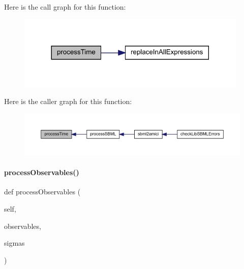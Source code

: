 Here is the call graph for this function\+:
\nopagebreak
\begin{figure}[H]
\begin{center}
\leavevmode
\includegraphics[width=312pt]{classamici_1_1sbml__import_1_1_sbml_importer_a2819c6ad1b541e49e728aa172e57208e_cgraph}
\end{center}
\end{figure}
Here is the caller graph for this function\+:
\nopagebreak
\begin{figure}[H]
\begin{center}
\leavevmode
\includegraphics[width=350pt]{classamici_1_1sbml__import_1_1_sbml_importer_a2819c6ad1b541e49e728aa172e57208e_icgraph}
\end{center}
\end{figure}
\mbox{\label{classamici_1_1sbml__import_1_1_sbml_importer_a903b87aa6c483832424fa2cc76adc4d5}} 
\paragraph{\texorpdfstring{process\+Observables()}{processObservables()}}
{\footnotesize\ttfamily def process\+Observables (\begin{DoxyParamCaption}\item[{}]{self,  }\item[{}]{observables,  }\item[{}]{sigmas }\end{DoxyParamCaption})}


